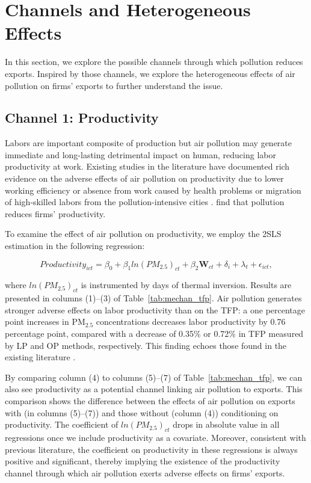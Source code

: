 \documentclass[12pt]{article}
\begin{document}
\section{Channels and Heterogeneous Effects}
\label{sec:5} %

In this section, we explore the possible channels through which pollution
reduces exports. Inspired by those channels, we explore the heterogeneous
effects of air pollution on firms' exports to further understand the issue. 

\subsection{Channel 1: Productivity}
\label{sec:5.1} 
Labors are important composite of production but air
pollution may generate immediate and long-lasting detrimental impact on
human, reducing labor productivity at work. Existing studies in the
literature have documented rich evidence on the adverse effects of air
pollution on productivity due to lower working efficiency or absence from
work caused by health problems %
\citep{chang2016particulate,fu2021air,somanathan2021impact} or migration of
high-skilled labors from the pollution-intensive cities %
\citep{chen2022effect,NBERw28401}. %
\citep{fu2021air,somanathan2021impact,chang2016particulate,adhvaryu2022management}
find that pollution reduces firms' productivity.

To examine the effect of air pollution on productivity, we
employ the 2SLS estimation in the following regression:

\begin{equation} \label{equ3}
Productivity_{ict}=\beta _{0}+\beta _{1}ln(PM_{2.5})_{ct}+\beta _{2}\mathbf{W}%
_{ct}+\delta _{i}+\lambda _{t}+\epsilon _{ict},
\end{equation}

where $ln(PM_{2.5})_{ct}$ is instrumented by days of thermal inversion. Results
are presented in columns (1)--(3) of Table~\ref{tab:mechan_tfp}. Air
pollution generates stronger adverse effects on labor productivity than on
the TFP: a one percentage point increases in $\mathrm{PM_{2.5}}$
concentrations decreases labor productivity by 0.76 percentage point,
compared with a decrease of 0.35\% or 0.72\% in TFP measured by LP and OP
methods, respectively. This finding echoes those found in the existing
literature %
\citep{fu2021air,somanathan2021impact,chang2016particulate,adhvaryu2022management}%
.

By comparing column (4) to columns (5)--(7) of Table~\ref{tab:mechan_tfp},
we can also see productivity as a potential channel linking air pollution to
exports. This comparison shows the difference between the effects of air
pollution on exports with (in columns (5)--(7)) and those without (column
(4)) conditioning on productivity. The coefficient of $ln(PM_{2.5})_{ct}$ drops
in absolute value in all regressions once we include productivity as a
covariate. Moreover, consistent with previous literature, the coefficient on productivity in these regressions is always positive and significant, thereby implying the existence of the productivity channel
through which air pollution exerts adverse effects on firms' exports. 
\end{document}
